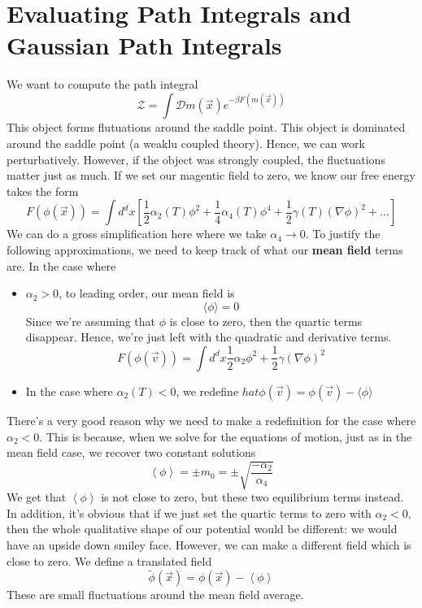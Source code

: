 \section{Evaluating Path Integrals and Gaussian Path Integrals }
We want to compute the path integral 
\[
	\mathcal{ Z} = \int \mathcal{D}m ( \vec{x}) e^ { - \beta F( m ( \vec{x}) ) } 
\] This object forms flutuations around the saddle point. 
This object is dominated around the saddle point (a weaklu coupled theory). 
Hence, we can work perturbatively. 
However, if the object was strongly coupled, the fluctuations matter just as much. 
If we set our magentic field to zero, we know our free energy takes the form 
\[
	F( \phi ( \vec{x}) )  = \int d^{d}x \left[ \frac{1}{2} \alpha_2(T ) \phi^2 + \frac{1}{4}\alpha_4(T) \phi^{4} + \frac{1}{ 2} \gamma( T ) ( \nabla \phi)^2 + \dots  \right] 
\] We can do a gross simplification here where we take $\alpha_4 \to 0 $.
To justify the following approximations, we need to keep track of what our 
\textbf{mean field} terms are. 
In the case where 
\begin{itemize}
	\item $\alpha_2 > 0 $, to leading order, our mean field is 
		\[
			\langle \phi \rangle  = 0
		\]  Since we're assuming that $\phi $ is close to zero, then 
		the quartic terms disappear. Hence, we're just left with 
		the quadratic and derivative terms. 
		\[
			F ( \phi( \vec{v}) ) = \int d^{d} x \frac{1}{2} \alpha_2 \phi^2 + \frac{1}{2 } \gamma ( \nabla \phi ) ^ 2  
		\] 
	\item In the case where $\alpha_2 ( T ) < 0 $, we redefine 
		$ hat{\phi }( \vec{v}) = \phi ( \vec{v})  - \langle \phi \rangle  $	


\end{itemize} 
There's a very good reason why we need to make a redefinition 
for the case where $\alpha_2 < 0 $. This is because, when we solve for the equations of motion, 
just as in the mean field case, we recover two constant solutions 
\[
 \left< \phi \right> = \pm m_0 = \pm \sqrt{ \frac{ - \alpha_2 }{\alpha_4 }} 
\] We get that $ \left< \phi \right> $ is not close to zero, but these
two equilibrium terms instead. 
In addition, it's obvious that if we just set the quartic terms to zero 
with $ \alpha_2 < 0 $, then the whole qualitative shape of our potential 
would be different: we would have an upside down smiley face.  
However, we can make a different field which is close to zero. We define a translated field
\[
	\widetilde{ \phi }( \vec{x})  = \phi ( \vec{x})  - \left< \phi \right>
\] These are small fluctuations around the mean field average. 
